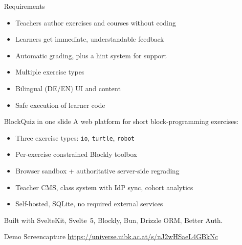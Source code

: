 \documentclass[11pt,t,usepdftitle=false,aspectratio=169]{beamer}
\begin{document}
\begin{frame}{Requirements}
  \begin{itemize}
    \item Teachers author exercises and courses without coding
    \item Learners get immediate, understandable feedback
    \item Automatic grading, plus a hint system for support
    \item Multiple exercise types
    \item Bilingual (DE/EN) UI and content
    \item Safe execution of learner code
  \end{itemize}
\end{frame}

\begin{frame}{BlockQuiz in one slide}
  A web platform for short block-programming exercises:
  \begin{itemize}
    \item Three exercise types: \texttt{io}, \texttt{turtle}, \texttt{robot}
    \item Per-exercise constrained Blockly toolbox
    \item Browser sandbox + authoritative server-side regrading
    \item Teacher CMS, class system with IdP sync, cohort analytics
    \item Self-hosted, SQLite, no required external services
  \end{itemize}
  {\footnotesize Built with SvelteKit, Svelte~5, Blockly, Bun, Drizzle ORM, Better Auth.}
\end{frame}

\begin{frame}{Demo Screencapture}
  \centering
  \href{https://universe.uibk.ac.at/s/nJ2wHSaeL4GBkNc}{https://universe.uibk.ac.at/s/nJ2wHSaeL4GBkNc}
\end{frame}
\end{document}
